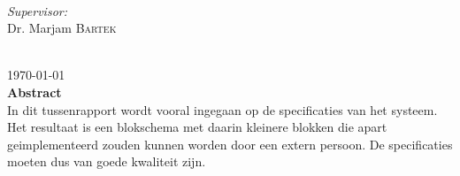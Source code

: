 \documentclass[12pt]{article}
\begin{document}
\begin{titlepage}
\begin{minipage}{0.4\textwidth}
\begin{flushleft}
\end{flushleft}
\end{minipage}
~
\begin{minipage}{0.4\textwidth}
\begin{flushright} \large
\emph{Supervisor:} \\
Dr. Marjam \textsc{Bartek} %
\end{flushright}
\end{minipage}\\[3cm]



{\large \today}\\ [1.5cm]


 
% 

\textbf{Abstract} \\
In dit tussenrapport wordt vooral ingegaan op de specificaties van het systeem. Het resultaat is een blokschema met daarin kleinere blokken die apart
geimplementeerd zouden kunnen worden door een extern persoon. De specificaties moeten dus van goede kwaliteit zijn. 

\vfill %

\end{titlepage}
\end{document}
